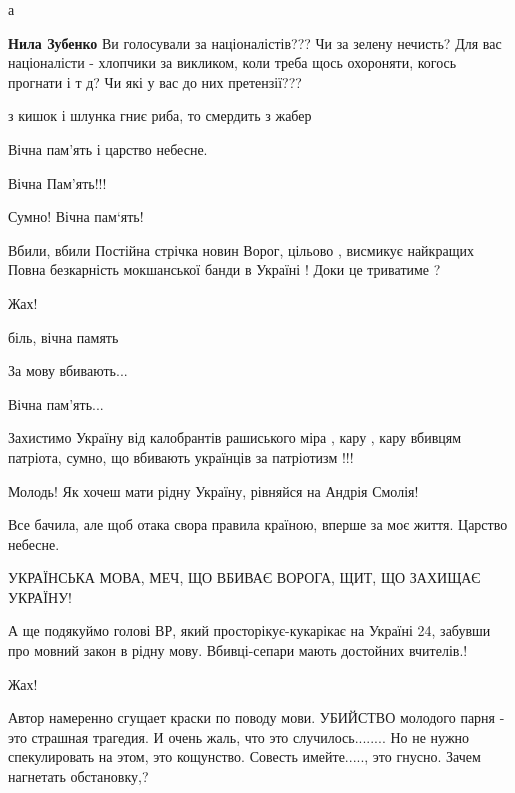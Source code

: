 \begin{itemize}
\begin{itemize}
а

\textbf{Нила Зубенко} Ви голосували за націоналістів??? Чи за зелену нечисть?
Для вас націоналісти - хлопчики за викликом, коли треба щось охороняти, когось прогнати і т д? Чи які у вас до них претензії???
\end{itemize} %

з кишок і шлунка гниє риба, то смердить з жабер

Вічна пам'ять і царство небесне.

Вічна Пам’ять!!!


Сумно! Вічна пам‘ять!

Вбили, вбили
Постійна стрічка новин
Ворог, цільово , висмикує найкращих
Повна безкарність мокшанської банди в Україні !
Доки це триватиме ?

Жах!

біль, вічна память

За мову вбивають...

Вічна пам'ять...

Захистимо Україну від калобрантів рашиського міра , кару , кару вбивцям патріота, сумно, що вбивають українців за патріотизм !!!

Молодь! Як хочеш мати рідну Україну, рівняйся на Андрія Смолія!


Все бачила, але щоб отака свора правила країною, вперше за моє життя.
Царство небесне.

УКРАЇНСЬКА МОВА, МЕЧ, ЩО ВБИВАЄ ВОРОГА, ЩИТ, ЩО ЗАХИЩАЄ УКРАЇНУ!


А ще подякуймо голові ВР, який просторікує-кукарікає на Україні 24, забувши про
мовний закон в рідну мову. Вбивці-сепари мають достойних вчителів.!

Жах!


Автор намеренно сгущает краски по поводу мови.
УБИЙСТВО молодого парня - это страшная трагедия. И очень жаль, что это случилось........
Но не нужно спекулировать на этом, это кощунство. Совесть имейте....., это гнусно.
Зачем нагнетать обстановку,?


\end{itemize}
